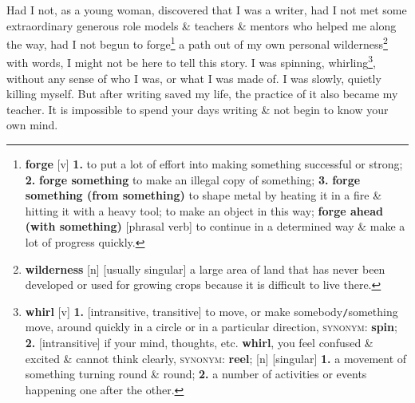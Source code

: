 \documentclass[oneside]{book}
\numberwithin{equation}{section}
\begin{document}
Had I not, as a young woman, discovered that I was a writer, had I not met some extraordinary generous role models \& teachers \& mentors who helped me along the way, had I not begun to forge\footnote{\textbf{forge} [v] \textbf{1.} to put a lot of effort into making something successful or strong; \textbf{2.} \textbf{forge something} to make an illegal copy of something; \textbf{3.} \textbf{forge something (from something)} to shape metal by heating it in a fire \& hitting it with a heavy tool; to make an object in this way; \textbf{forge ahead (with something)} [phrasal verb] to continue in a determined way \& make a lot of progress quickly.} a path out of my own personal wilderness\footnote{\textbf{wilderness} [n] [usually singular] a large area of land that has never been developed or used for growing crops because it is difficult to live there.} with words, I might not be here to tell this story. I was spinning, whirling\footnote{\textbf{whirl} [v] \textbf{1.} [intransitive, transitive] to move, or make somebody\texttt{/}something move, around quickly in a circle or in a particular direction, \textsc{synonym}: \textbf{spin}; \textbf{2.} [intransitive] if your mind, thoughts, etc. \textbf{whirl}, you feel confused \& excited \& cannot think clearly, \textsc{synonym}: \textbf{reel}; [n] [singular] \textbf{1.} a movement of something turning round \& round; \textbf{2.} a number of activities or events happening one after the other.}, without any sense of who I was, or what I was made of. I was slowly, quietly killing myself. But after writing saved my life, the practice of it also became my teacher. It is impossible to spend your days writing \& not begin to know your own mind.
\end{document}
